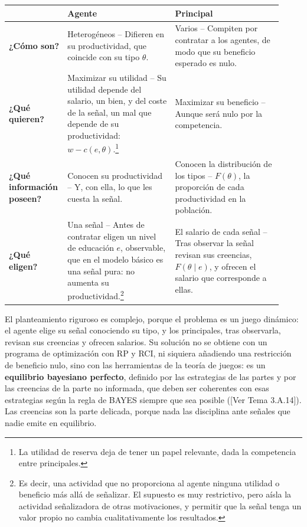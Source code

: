 \documentclass[10pt,a4paper]{article}
\newcommand{\authorfont}[1]{{\fontfamily{EBGaramond-TLF}\selectfont #1}}
\begin{document}
\begin{center}
\renewcommand{\arraystretch}{1.25}
\setlength{\tabcolsep}{6pt}
\begin{tabular}{|p{0.16\linewidth}|p{0.38\linewidth}|p{0.38\linewidth}|}
\hline
 & \textbf{Agente} & \textbf{Principal} \\
\hline
\textbf{¿Cómo son?} &
Heterogéneos -- {\scriptsize Difieren en su productividad, que coincide con su tipo $\theta$.} &
Varios -- {\scriptsize Compiten por contratar a los agentes, de modo que su beneficio esperado es nulo.} \\
\hline
\textbf{¿Qué quieren?} &
Maximizar su utilidad -- {\scriptsize Su utilidad depende del salario, un bien, y del coste de la señal, un mal que depende de su productividad: $w-c(e,\theta)$.}\footnote{%
    La utilidad de reserva deja de tener un papel relevante, dada la competencia entre principales.
} &
Maximizar su beneficio -- {\scriptsize Aunque será nulo por la competencia.} \\
\hline
\textbf{¿Qué información poseen?} &
Conocen su productividad -- {\scriptsize Y, con ella, lo que les cuesta la señal.} &
Conocen la distribución de los tipos -- {\scriptsize $F(\theta)$, la proporción de cada productividad en la población.} \\
\hline
\textbf{¿Qué eligen?} &
Una señal -- {\scriptsize Antes de contratar eligen un nivel de educación $e$, observable, que en el modelo básico es una señal pura: no aumenta su productividad.}\footnote{%
    Es decir, una actividad que no proporciona al agente ninguna utilidad o beneficio más allá de señalizar. El supuesto es muy restrictivo, pero aísla la actividad señalizadora de otras motivaciones, y permitir que la señal tenga un valor propio no cambia cualitativamente los resultados.
} &
El salario de cada señal -- {\scriptsize Tras observar la señal revisan sus creencias, $F(\theta\mid e)$, y ofrecen el salario que corresponde a ellas.} \\
\hline
\end{tabular}
\end{center}

El planteamiento riguroso es complejo, porque el problema es un juego dinámico: el agente elige su señal conociendo su tipo, y los principales, tras observarla, revisan sus creencias y ofrecen salarios. Su solución no se obtiene con un programa de optimización con RP y RCI, ni siquiera añadiendo una restricción de beneficio nulo, sino con las herramientas de la teoría de juegos: es un \textbf{equilibrio bayesiano perfecto}, definido por las estrategias de las partes y por las creencias de la parte no informada, que deben ser coherentes con esas estrategias según la regla de BAYES siempre que sea posible ([\authorfont{Ver Tema 3.A.14}]). Las creencias son la parte delicada, porque nada las disciplina ante señales que nadie emite en equilibrio.
\end{document}
